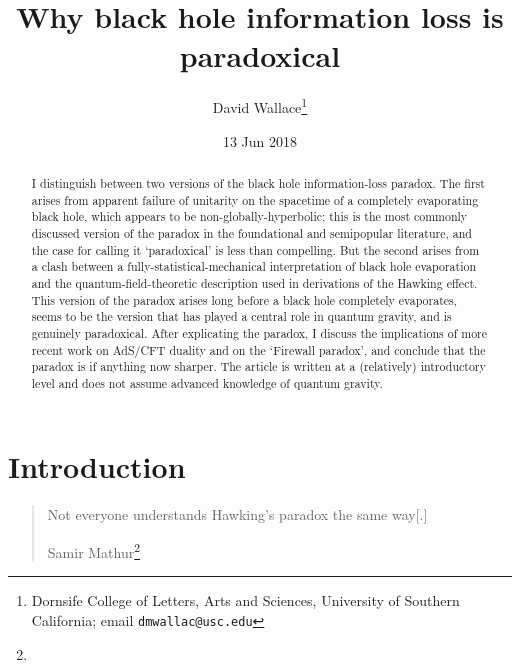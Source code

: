 \documentclass[12pt]{article}
\date{13 Jun 2018}
\begin{document}
\title{Why black hole information loss is paradoxical}\author{David Wallace\thanks{Dornsife College of Letters, Arts and Sciences, University of Southern California; email \texttt{dmwallac@usc.edu}}}

\maketitle


\begin{abstract}
I distinguish between two versions of the black hole information-loss paradox. The first arises from apparent failure of unitarity on the spacetime of a completely evaporating black hole, which appears to be non-globally-hyperbolic; this is the most commonly discussed version of the paradox in the foundational and semipopular literature, and the case for calling it `paradoxical' is less than compelling. But the second arises from a clash between a fully-statistical-mechanical interpretation of black hole evaporation and the quantum-field-theoretic description used in derivations of the Hawking effect. This version of the paradox arises long before a black hole completely evaporates, seems to be the version that has played a central role in quantum gravity, and is genuinely paradoxical. After explicating the paradox, I discuss the implications of more recent work on AdS/CFT duality and on the `Firewall paradox', and conclude that the paradox is if anything now sharper. The article is written at a (relatively) introductory level and does not assume advanced knowledge of quantum gravity.
\end{abstract}

\newpage

\section{Introduction}

\begin{quote}
Not everyone understands Hawking's paradox the same way[.]

\begin{flushright}
Samir Mathur\footnote{}
\end{flushright}
\end{quote}
\end{document}
